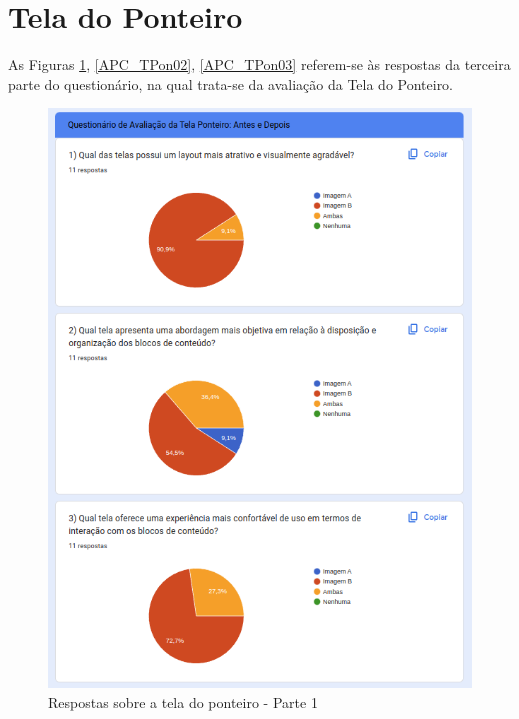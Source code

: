 \newpage

\section{Tela do Ponteiro}

As Figuras \ref{APC_TPon01}, \ref{APC_TPon02}, \ref{APC_TPon03} referem-se às respostas da terceira parte do questionário, na qual trata-se da avaliação da Tela do Ponteiro.

\begin{figure}[!h]
	\begin{center}
	    \includegraphics[scale=0.7]{figs/Answers/Professionals/17.png}
	\end{center}
	\caption{\label{APC_TPon01}Respostas sobre a tela do ponteiro - Parte 1}
\end{figure}

\newpage

